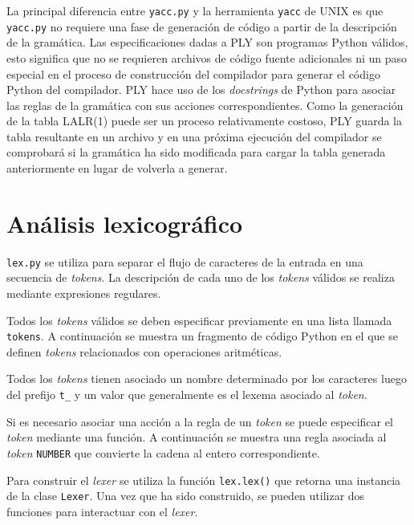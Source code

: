 \documentclass{article}
\begin{document}
La principal diferencia entre \texttt{yacc.py} y la herramienta \texttt{yacc}
de UNIX es que \texttt{yacc.py} no requiere una fase de generación de código a
partir de la descripción de la gramática. Las especificaciones dadas a PLY son
programas Python válidos, esto significa que no se requieren archivos de código
fuente adicionales ni un paso especial en el proceso de construcción del
compilador para generar el código Python del compilador. PLY hace uso de los
\emph{docstrings} de Python para asociar las reglas de la gramática con sus
acciones correspondientes. Como la generación de la tabla LALR(1) puede ser un
proceso relativamente costoso, PLY guarda la tabla resultante en un archivo y en
una próxima ejecución del compilador se comprobará si la gramática ha sido
modificada para cargar la tabla generada anteriormente en lugar de volverla a
generar.

\section{Análisis lexicográfico}

\texttt{lex.py} se utiliza para separar el flujo de caracteres de la entrada en
una secuencia de \textit{tokens}. La descripción de cada uno de los
\textit{tokens} válidos se realiza mediante expresiones regulares.

Todos los \textit{tokens} válidos se deben especificar previamente en una lista
llamada \texttt{tokens}. A continuación se muestra un fragmento de código
Python en el que se definen \textit{tokens} relacionados con operaciones
aritméticas.

\begin{quote}

\end{quote}

Todos los \textit{tokens} tienen asociado un nombre determinado por los
caracteres luego del prefijo \texttt{t\_} y un valor que generalmente es el
lexema asociado al \textit{token}.

Si es necesario asociar una acción a la regla de un \textit{token} se puede
especificar el \textit{token} mediante una función. A continuación se muestra
una regla asociada al \textit{token} \texttt{NUMBER} que convierte la cadena al
entero correspondiente.

\begin{quote}

\end{quote}

Para construir el \textit{lexer} se utiliza la función \texttt{lex.lex()} que
retorna una instancia de la clase \texttt{Lexer}. Una vez que ha sido
construido, se pueden utilizar dos funciones para interactuar con el
\textit{lexer}.
\end{document}
